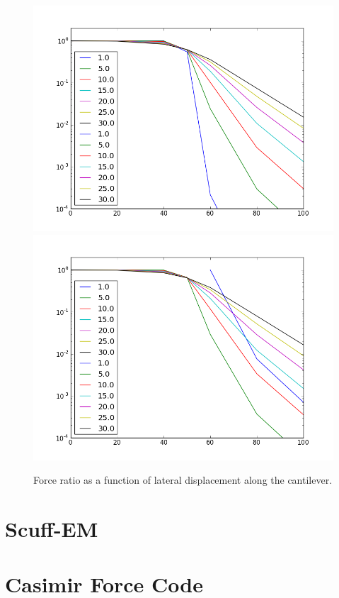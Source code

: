 \documentclass[11pt]{article}
\begin{document}
\begin{figure}[h]
\centering
\includegraphics[width=5in]{lateral_force_drop}
\includegraphics[width=5in]{lateral_force_drop_finite}
\caption{Force ratio as a function of lateral displacement along the cantilever.}\label{fig:latdrop}
\end{figure}

\pagebreak
\appendix
\section{Scuff-EM}
\section{Casimir Force Code}



\end{document}
